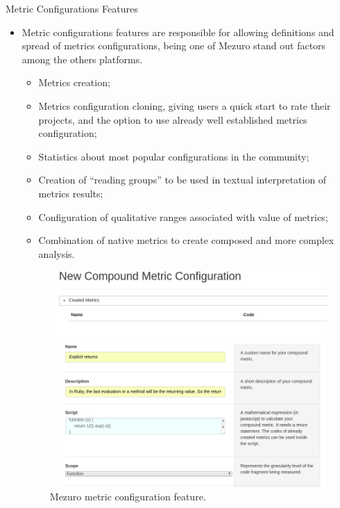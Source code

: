 \begin{block}{Metric Configurations Features}
    \begin{itemize}
        \item Metric configurations features are responsible for allowing
            definitions and spread of metrics configurations, being
            one of Mezuro stand out factors among the others platforms.
            \begin{itemize}
                \item Metrics creation;
                \item Metrics configuration cloning, giving users a quick start
                    to rate their projects, and the option to use already well
                    established metrics configuration;
                \item Statistics about most popular configurations in the
                    community;
                \item Creation of ``reading groups'' to be used in textual
                    interpretation of metrics results;
                \item Configuration of qualitative ranges associated with
                    value of metrics;
                \item Combination of native metrics to create composed and more
                    complex analysis.
            \end{itemize}

        \begin{figure}
            \begin{center}
                \includegraphics[scale=1]{figures/MezuroFeature2.png}
                \caption{Mezuro metric configuration feature.}
                \label{fig:feature1}
            \end{center}
        \end{figure}

    \end{itemize}
\end{block}
